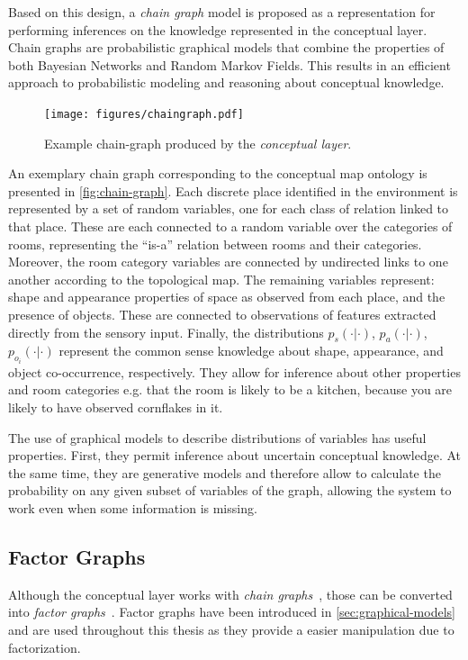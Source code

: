 Based on this design, a \emph{chain graph} model is proposed as a 
representation for performing inferences on the knowledge represented in the conceptual 
layer. Chain graphs are probabilistic graphical models that combine the properties of 
both Bayesian Networks and Random Markov Fields. This results in an efficient approach to 
probabilistic modeling and reasoning about conceptual knowledge.

\begin{figure}[h]
\centering
\texttt{[image: figures/chaingraph.pdf]}
\caption{\label{fig:chain-graph}Example chain-graph produced by the \emph{conceptual layer}.}
\end{figure}

An exemplary chain graph corresponding to the conceptual map ontology is presented
in \autoref{fig:chain-graph}. 
Each discrete place identified in the environment is represented by a set of random variables, 
one for each class of relation linked to that place. These are each connected to a random variable
over the categories of rooms, representing the ``is-a'' relation between rooms and their categories. 
Moreover, the room category variables are connected by undirected links to one another according 
to the topological map. The remaining variables represent: shape and appearance properties of space 
as observed from each place, and the presence of objects. 
These are connected to observations of features extracted directly from 
the sensory input. Finally, the 
distributions $p_{s}(\cdot|\cdot)$, $p_a(\cdot|\cdot)$, $p_{o_i}(\cdot|\cdot)$ 
represent the common sense knowledge about shape, appearance, and object co-occurrence, respectively. 
They allow for inference about other properties and room categories e.g. that the room is likely to be a kitchen,
because you are likely to have observed cornflakes in it. 

The use of graphical models to describe distributions of variables has useful properties.
First, they permit inference about uncertain conceptual knowledge. At the same time, they are 
generative models and therefore allow to calculate the probability
on any given subset of variables of the graph, allowing the system to work even when some
information is missing.

\subsection{Factor Graphs}
Although the conceptual layer works with \emph{chain graphs}~\cite{lauritzen2002chain},
those can be converted into \emph{factor graphs}~\cite{kschischang2001factor}.
Factor graphs have been introduced in \autoref{sec:graphical-models} and are used
throughout this thesis as they provide a easier manipulation due to factorization.

